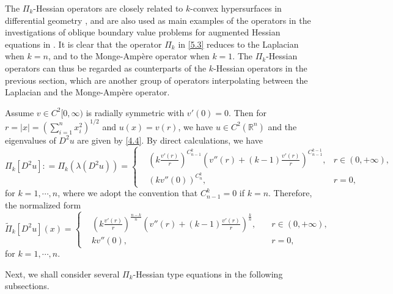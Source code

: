 \documentclass[a4paper,11pt]{amsart}
\theoremstyle{plain}
\theoremstyle{remark}
\numberwithin{equation}{section}
\numberwithin{figure}{section}
\numberwithin{remark}{section}
\begin{document}
\begin{sloppypar}
The $\Pi_k$-Hessian operators are closely related to $k$-convex hypersurfaces in differential geometry \cite{S1986, S1987}, and are also used as main examples of the operators in the investigations of oblique boundary value problems for augmented Hessian equations in \cite{JT2017, JT2018, JT2019, T2020}.
It is clear that the operator $\Pi_k$ in \eqref{5.3} reduces to the Laplacian when $k=n$, and to the Monge-Amp\`ere operator when $k=1$. The $\Pi_k$-Hessian operators can thus be regarded as counterparts of the $k$-Hessian operators in the previous section,  which are another group of operators interpolating between the Laplacian and the Monge-Amp\`ere operator.

Assume $v\in C^2[0, \infty)$ is radially symmetric with $v'(0)=0$. Then for $r=|x|=(\sum\limits_{i=1}^n x_i^2)^{1/2}$ and  $u(x)=v(r)$, we have $u\in C^2(\mathbb{R}^n)$ and the eigenvalues of $D^2u$ are given by \eqref{4.4}.
By direct calculations, we have
	\begin{equation}\label{5.4}
	\Pi_k[D^2u]: = \Pi_k(\lambda (D^2u)) =
	\left\{
	\begin{aligned}
	&\left(k\frac{v'(r)}{r}\right)^{C_{n-1}^k}\left(v''(r)+(k-1)\frac{v'(r)}{r}\right)^{C_{n-1}^{k-1}}, & r\in (0, +\infty),\\
	& (kv''(0))^{C_n^k}, & r=0, \ \ \ \ \  \ \ \  \
	\end{aligned}
	\right.
	\end{equation}
for $k=1, \cdots, n$, where we adopt the convention that $C_{n-1}^k=0$ if $k=n$. Therefore, the normalized form
	\begin{equation}\label{5.5}
	\tilde \Pi_k[D^2u](x)=
	\left\{
	\begin{aligned}
	& \left(k\frac{v'(r)}{r}\right)^{\frac{n-k}{n}}\left(v''(r)+(k-1)\frac{v'(r)}{r}\right)^{\frac{k}{n}}, & \quad r\in (0, +\infty),\\
	& kv''(0), & \quad r=0, \ \ \ \ \  \ \ \  \
	\end{aligned}
	\right.
	\end{equation}
for $k=1, \cdots, n$.

Next, we shall consider several $\Pi_k$-Hessian type equations in the following subsections. 


\end{sloppypar}
\end{document}
